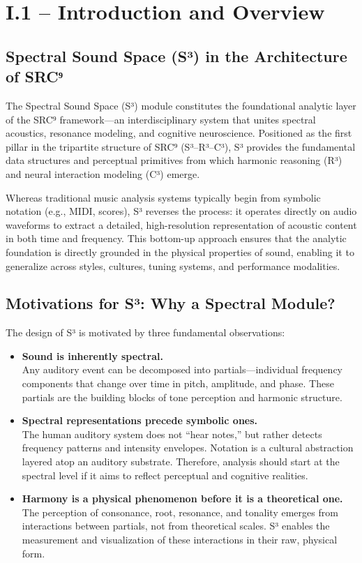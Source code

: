 \section*{I.1 – Introduction and Overview}

\subsection*{Spectral Sound Space (S³) in the Architecture of SRC⁹}

The Spectral Sound Space (S³) module constitutes the foundational analytic layer of the SRC⁹ framework—an interdisciplinary system that unites spectral acoustics, resonance modeling, and cognitive neuroscience. Positioned as the first pillar in the tripartite structure of SRC⁹ (S³–R³–C³), S³ provides the fundamental data structures and perceptual primitives from which harmonic reasoning (R³) and neural interaction modeling (C³) emerge.

Whereas traditional music analysis systems typically begin from symbolic notation (e.g., MIDI, scores), S³ reverses the process: it operates directly on audio waveforms to extract a detailed, high-resolution representation of acoustic content in both time and frequency. This bottom-up approach ensures that the analytic foundation is directly grounded in the physical properties of sound, enabling it to generalize across styles, cultures, tuning systems, and performance modalities.

\subsection*{Motivations for S³: Why a Spectral Module?}

The design of S³ is motivated by three fundamental observations:

\begin{itemize}
    \item \textbf{Sound is inherently spectral.}\\
    Any auditory event can be decomposed into partials—individual frequency components that change over time in pitch, amplitude, and phase. These partials are the building blocks of tone perception and harmonic structure.

    \item \textbf{Spectral representations precede symbolic ones.}\\
    The human auditory system does not “hear notes,” but rather detects frequency patterns and intensity envelopes. Notation is a cultural abstraction layered atop an auditory substrate. Therefore, analysis should start at the spectral level if it aims to reflect perceptual and cognitive realities.

    \item \textbf{Harmony is a physical phenomenon before it is a theoretical one.}\\
    The perception of consonance, root, resonance, and tonality emerges from interactions between partials, not from theoretical scales. S³ enables the measurement and visualization of these interactions in their raw, physical form.
\end{itemize}

